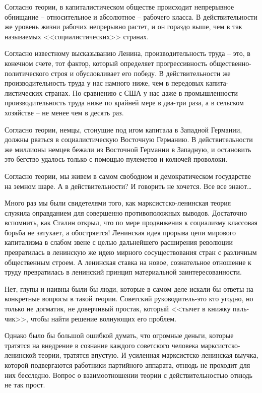 \documentclass{book}
\begin{document}
Согласно теории, в капиталистическом обществе происхо­дит непрерывное обнищание -- относительное и абсолютное -- рабочего класса. 
В действительности же уровень жизни рабо­чих непрерывно растет, и он гораздо выше, чем в так называе­мых <<социалистических>> 
странах.

Согласно известному высказыванию Ленина, производительность труда -- это, в конечном счете, тот фактор, который опре­деляет 
прогрессивность общественно-политического строя и обусловливает его победу. В действительности же производи­тельность труда у нас 
намного ниже, чем в передовых капита­листических странах. По сравнению с США у нас даже в про­мышленности производительность труда 
ниже по крайней мере в два-три раза, а в сельском хозяйстве -- не менее чем в десять раз.

Согласно теории, немцы, стонущие под игом капитала в За­падной Германии, должны рваться в социалистическую Восточ­ную Германию. В 
действительности же миллионы немцев бежа­ли из Восточной Германии в Западную, и остановить это бегст­во удалось только с помощью 
пулеметов и колючей прово­локи.

Согласно теории, мы живем в самом свободном и демокра­тическом государстве на земном шаре. А в действительности? И говорить не 
хочется. Все все знают\ldots

Много раз мы были свидетелями того, как марксистско-ленинская теория служила оправданием для совершенно противоположных выводов. 
Достаточно вспомнить, как Сталин открыл, что по мере продвижения к социализму классовая борьба не затухает, а обостряется! 
Ленинская идея прорыва цепи мирового капитализма в слабом звене с целью даль\-ней\-­ше\-го расширения революции превратилась в 
ленинскую же идею мирного сосуществования стран с различным общест­венным строем. А ленинская ставка на новое, сознательное 
отношение к труду превратилась в ленинский принцип мате­риальной заинтересованности.

Нет, глупы и наивны были бы люди, которые в самом деле искали бы ответы на конкретные вопросы в такой теории. Советский 
руководитель-это кто угодно, но только не догма­тик, не доверчивый простак, который <<тычет в книжку паль­чик>>, чтобы найти решение 
волнующих его проблем.

Однако было бы большой ошибкой думать, что огромные деньги, которые тратятся на внедрение в сознание каждого советского человека 
марксистско-ленинской теории, тратятся впустую. И усиленная марксистско-ленинская выучка, кото­рой подвергаются работники 
партийного аппарата, отнюдь не проходит для них бесследно. Вопрос о взаимоотношении тео­рии с действительностью отнюдь не так 
прост.
\end{document}

